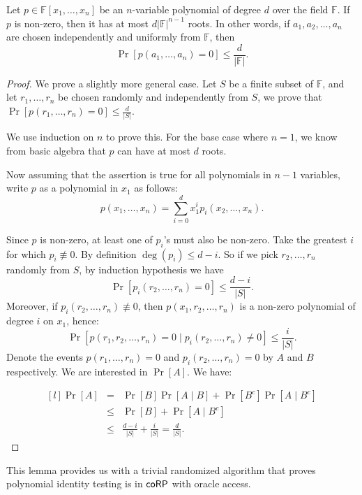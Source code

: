 \begin{lemma} 
Let $p \in \mathbb{F}[x_1, \ldots, x_n]$ be an $n$-variable polynomial of degree $d$ over the field $\mathbb{F}$. If $p$ is non-zero, then it has at most $d \vert \mathbb{F} \vert ^{n-1}$ roots. In other words, if $a_1, a_2, \ldots, a_n$ are chosen independently and uniformly from $\mathbb{F}$, then $$\Pr[ p(a_1, \ldots, a_n) = 0 ] \leq \frac{d}{\vert \mathbb{F} \vert}.$$
\end{lemma}
\begin{proof}
We prove a slightly more general case. Let $S$ be a finite subset of $\mathbb{F}$, and let $r_1, \ldots, r_n$ be chosen randomly and independently from $S$, we prove that 
$\Pr[p(r_1, \ldots, r_n) = 0] \leq \frac{d}{\vert S \vert}$.

We use induction on $n$ to prove this. For the base case where $n = 1$, we know from basic algebra that $p$ can have at most $d$ roots.

Now assuming that the assertion is true for all polynomials in $n-1$ variables, write $p$ as a polynomial in $x_1$ as follows:
$$p(x_1, \ldots, x_n) = \sum_{i=0}^d x_1^i p_i(x_2, \ldots, x_n).$$

Since $p$ is non-zero, at least one of $p_i$'s must also be non-zero. Take the greatest $i$ for which $p_i \not \equiv 0$. By definition $\deg(p_i) \leq d - i$. So if we pick $r_2, \ldots, r_n$ randomly from $S$, by induction hypothesis we have $$\Pr[p_i(r_2, \ldots, r_n) = 0] \leq \frac{d-i}{\vert S \vert}.$$
Moreover, if $p_i(r_2, \ldots, r_n) \not \equiv 0$, then $p(x_1, r_2, \ldots, r_n)$ is a non-zero polynomial of degree $i$ on $x_1$, hence:
$$\Pr[p(r_1, r_2, \ldots, r_n) = 0 \mid p_i(r_2, \ldots, r_n) \neq 0] \leq \frac{i}{\vert S \vert}.$$
Denote the events $p(r_1, \ldots, r_n) = 0$ and $p_i (r_2, \ldots, r_n) = 0$ by $A$ and $B$ respectively. We are interested in $\Pr[A]$. We have:

$$
\begin{matrix*}[l]
\Pr[A] & = & \Pr[B] \Pr[A \mid B] + \Pr[B^c] \Pr[A \mid B^c] \\ 
 & \leq & \Pr[B] + \Pr[A \mid B^c]  \\ 
 & \leq & \frac{d - i}{\vert S \vert} + \frac{i}{\vert S \vert} = \frac{d}{\vert S \vert}.
\end{matrix*}
$$
\end{proof}

This lemma provides us with a trivial randomized algorithm that proves polynomial identity testing is in $\mathsf{coRP}$ with oracle access. 

